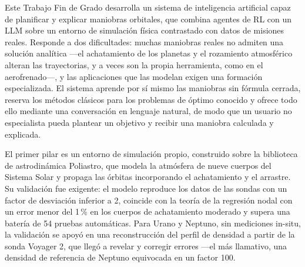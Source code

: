 \begin{resumen}

Este Trabajo Fin de Grado desarrolla un sistema de inteligencia artificial capaz de planificar y explicar maniobras orbitales, que combina agentes de \acrfull{RL} con un \acrfull{LLM} sobre un entorno de simulación física contrastado con datos de misiones reales. Responde a dos dificultades: muchas maniobras reales no admiten una solución analítica ---el achatamiento de los planetas y el rozamiento atmosférico alteran las trayectorias, y a veces son la propia herramienta, como en el aerofrenado---, y las aplicaciones que las modelan exigen una formación especializada. El sistema aprende por sí mismo las maniobras sin fórmula cerrada, reserva los métodos clásicos para los problemas de óptimo conocido y ofrece todo ello mediante una conversación en lenguaje natural, de modo que un usuario no especialista pueda plantear un objetivo y recibir una maniobra calculada y explicada.

El primer pilar es un entorno de simulación propio, construido sobre la biblioteca de astrodinámica Poliastro, que modela la atmósfera de nueve cuerpos del Sistema Solar y propaga las órbitas incorporando el achatamiento y el arrastre. Su validación fue exigente: el modelo reproduce los datos de las sondas con un factor de desviación inferior a 2, coincide con la teoría de la regresión nodal con un error menor del 1\,\% en los cuerpos de achatamiento moderado y supera una batería de 54 pruebas automáticas. Para Urano y Neptuno, sin mediciones in-situ, la validación se apoyó en una reconstrucción del perfil de densidad a partir de la sonda Voyager 2, que llegó a revelar y corregir errores ---el más llamativo, una densidad de referencia de Neptuno equivocada en un factor 100.


\end{resumen}
